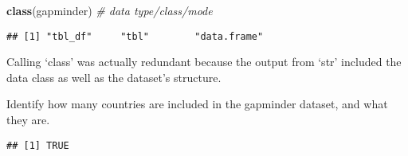 \documentclass[]{article}
\newenvironment{Shaded}{\begin{snugshade}}{\end{snugshade}}
\newcommand{\KeywordTok}[1]{\textcolor[rgb]{0.13,0.29,0.53}{\textbf{#1}}}
\newcommand{\StringTok}[1]{\textcolor[rgb]{0.31,0.60,0.02}{#1}}
\newcommand{\CommentTok}[1]{\textcolor[rgb]{0.56,0.35,0.01}{\textit{#1}}}
\newcommand{\OperatorTok}[1]{\textcolor[rgb]{0.81,0.36,0.00}{\textbf{#1}}}
\newcommand{\NormalTok}[1]{#1}
\begin{document}
\begin{Shaded}
\begin{Highlighting}[]
\KeywordTok{class}\NormalTok{(gapminder)  }\CommentTok{# data type/class/mode}
\end{Highlighting}
\end{Shaded}

\begin{verbatim}
## [1] "tbl_df"     "tbl"        "data.frame"
\end{verbatim}

Calling `class' was actually redundant because the output from `str'
included the data class as well as the dataset's structure.

Identify how many countries are included in the gapminder dataset, and
what they are.

\begin{Shaded}
\end{Shaded}

\begin{verbatim}
## [1] TRUE
\end{verbatim}

\begin{Shaded}
\end{Shaded}
\end{document}
